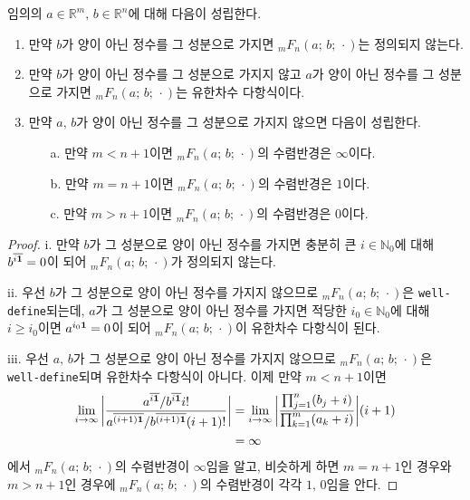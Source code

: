 \begin{theorem}
    임의의 $a\in\mathbb{R}^m,\,b\in\mathbb{R}^n$에 대해 다음이 성립한다.
    \begin{enumerate}
        \item 만약 $b$가 양이 아닌 정수를 그 성분으로 가지면 $_mF_n(a;\,b;\,\cdot)$는 정의되지 않는다.
        \item 만약 $b$가 양이 아닌 정수를 그 성분으로 가지지 않고 $a$가 양이 아닌 정수를 그 성분으로 가지면 $_mF_n(a;\,b;\,\cdot)$는 유한차수 다항식이다.
        \item 만약 $a,\,b$가 양이 아닌 정수를 그 성분으로 가지지 않으면 다음이 성립한다.
        \begin{enumerate}
            \item[a.] 만약 $m<n+1$이면 $_mF_n(a;\,b;\,\cdot)$의 수렴반경은 $\infty$이다.
            \item[b.] 만약 $m=n+1$이면 $_mF_n(a;\,b;\,\cdot)$의 수렴반경은 $1$이다.
            \item[c.] 만약 $m>n+1$이면 $_mF_n(a;\,b;\,\cdot)$의 수렴반경은 $0$이다.
        \end{enumerate}
    \end{enumerate}
\end{theorem}

\begin{proof}
    i. 만약 $b$가 그 성분으로 양이 아닌 정수를 가지면 충분히 큰 $i\in\mathbb{N}_0$에 대해 $b^{\overline{i\mathbf{1}}}=0$이 되어 $_mF_n(a;\,b;\,\cdot)$가 정의되지 않는다.

    ii. 우선 $b$가 그 성분으로 양이 아닌 정수를 가지지 않으므로 $_mF_n(a;\,b;\,\cdot)$은 \texttt{well-define}되는데, $a$가 그 성분으로 양이 아닌 정수를 가지면 적당한 $i_0\in\mathbb{N}_0$에 대해 $i\geq i_0$이면 $a^{i_0\mathbf{1}}=0$이 되어 $_mF_n(a;\,b;\,\cdot)$이 유한차수 다항식이 된다.

    iii. 우선 $a,\,b$가 그 성분으로 양이 아닌 정수를 가지지 않으므로 $_mF_n(a;\,b;\,\cdot)$은 \texttt{well-define}되며 유한차수 다항식이 아니다. 이제 만약 $m<n+1$이면
    \begin{align*}
        \lim_{i\to\infty}\bigg|\frac{a^{\overline{i\mathbf{1}}}/b^{\overline{i\mathbf{1}}}i!}{a^{\overline{(i+1)\mathbf{1}}}/b^{\overline{(i+1)\mathbf{1}}}(i+1)!}\bigg|&=\lim_{i\to\infty}\bigg|\frac{\prod_{j=1}^n(b_j+i)}{\prod_{k=1}^m(a_k+i)}\bigg|(i+1)\\
        &=\infty
    \end{align*}
    에서 $_mF_n(a;\,b;\,\cdot)$의 수렴반경이 $\infty$임을 알고, 비슷하게 하면 $m=n+1$인 경우와 $m>n+1$인 경우에 $_mF_n(a;\,b;\,\cdot)$의 수렴반경이 각각 $1,\,0$임을 안다.
\end{proof}

